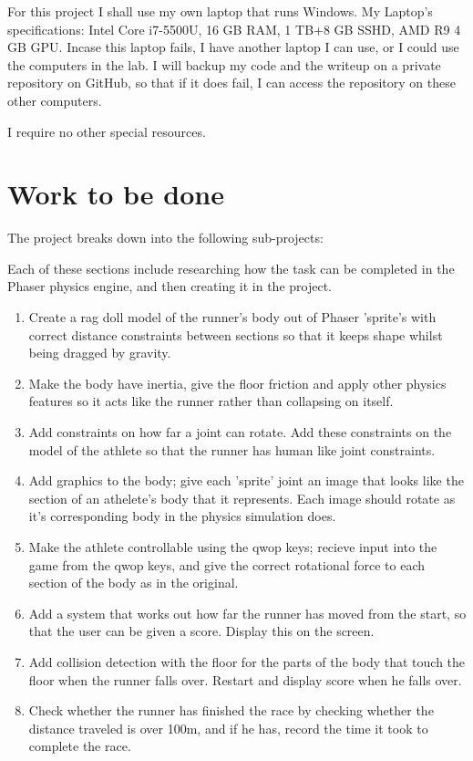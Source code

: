 \documentclass[12pt,a4paper,twoside]{article}
\begin{document}

For this project I shall use my own laptop that runs Windows.
My Laptop's specifications:
Intel Core i7-5500U, 16 GB RAM, 1 TB+8 GB SSHD, AMD R9 4 GB GPU.
Incase this laptop fails, I have another laptop I can use, or I could use the computers in the lab. I will backup my code and the writeup on a private repository on GitHub, so that if it does fail, I can access the repository on these other computers.

I require no other special resources.

\section*{Work to be done}


The project breaks down into the following sub-projects:

Each of these sections include researching how the task can be completed in the Phaser physics engine, and then creating it in the project.

\begin{enumerate}
\item Create a rag doll model of the runner's body out of Phaser 'sprite's with correct distance constraints between sections so that it keeps shape whilst being dragged by gravity.
\item Make the body have inertia, give the floor friction and apply other physics features so it acts like the runner rather than collapsing on itself.
\item Add constraints on how far a joint can rotate. Add these constraints on the model of the athlete so that the runner has human like joint constraints.
\item Add graphics to the body; give each 'sprite' joint an image that looks like the section of an athelete's body that it represents. Each image should rotate as it's corresponding body in the physics simulation does.
\item Make the athlete controllable using the qwop keys; recieve input into the game from the qwop keys, and give the correct rotational force to each section of the body as in the original.
\item Add a system that works out how far the runner has moved from the start, so that the user can be given a score. Display this on the screen.
\item Add collision detection with the floor for the parts of the body that touch the floor when the runner falls over. Restart and display score when he falls over.
\item Check whether the runner has finished the race by checking whether the distance traveled is over 100m, and if he has, record the time it took to complete the race.
\end{enumerate}
\end{document}
